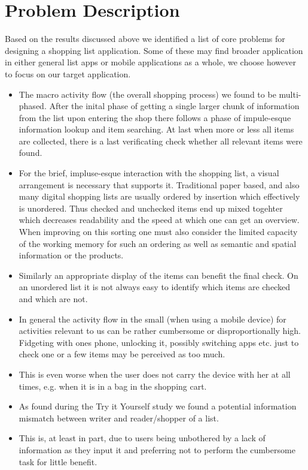 \documentclass{scrartcl}
\begin{document}
\section{Problem Description}
\label{sec:problem}
Based on the results discussed above we identified a list of core problems for designing a shopping list application.
Some of these may find broader application in either general list apps or mobile applications as a whole, we choose however to focus on our target application.

\begin{itemize}
  \item The macro activity flow (the overall shopping process) we found to be multi-phased. 
    After the inital phase of getting a single larger chunk of information from the list upon entering the shop there follows a phase of impule-esque information lookup and item searching.
    At last when more or less all items are collected, there is a last verificating check whether all relevant items were found.
  \item For the brief, impluse-esque interaction with the shopping list, a visual arrangement is necessary that supports it. 
    Traditional paper based, and also many digital shopping lists are usually ordered by insertion which effectively is unordered. 
    Thus checked and unchecked items end up mixed togehter which decreases readability and the speed at which one can get an overview.
    When improving on this sorting one must also consider the limited capacity of the working memory for such an ordering as well as semantic and spatial information or the products.
  \item Similarly an appropriate display of the items can benefit the final check. 
    On an unordered list it is not always easy to identify which items are checked and which are not.

  \item In general the activity flow in the small (when using a mobile device) for activities relevant to us can be rather cumbersome or disproportionally high.
    Fidgeting with ones phone, unlocking it, possibly switching apps etc. just to check one or a few items may be perceived as too much.
  \item This is even worse when the user does not carry the device with her at all times, e.g. when it is in a bag in the shopping cart. 

  \item As found during the Try it Yourself study we found a potential information mismatch between writer and reader/shopper of a list. 
  \item This is, at least in part, due to users being unbothered by a lack of information as they input it and preferring not to perform the cumbersome task for little benefit.
\end{itemize}
\end{document}
